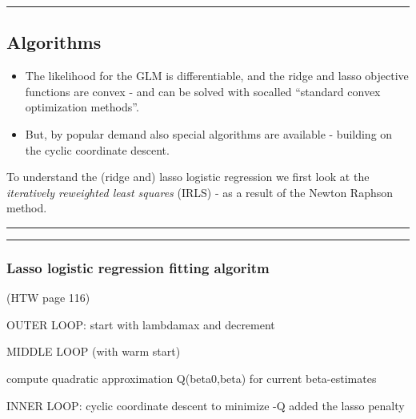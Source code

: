 \documentclass[
  letterpaper,
  DIV=11,
  numbers=noendperiod]{scrartcl}
\newenvironment{Shaded}{\begin{snugshade}}{\end{snugshade}}
\newcommand{\ControlFlowTok}[1]{\textcolor[rgb]{0.00,0.23,0.31}{#1}}
\newcommand{\FunctionTok}[1]{\textcolor[rgb]{0.28,0.35,0.67}{#1}}
\newcommand{\NormalTok}[1]{\textcolor[rgb]{0.00,0.23,0.31}{#1}}
\newcommand{\SpecialCharTok}[1]{\textcolor[rgb]{0.37,0.37,0.37}{#1}}
\providecommand{\tightlist}{%
  \setlength{\itemsep}{0pt}\setlength{\parskip}{0pt}}\usepackage{longtable,booktabs,array}
\begin{document}
\begin{center}\rule{0.5\linewidth}{0.5pt}\end{center}

\hypertarget{algorithms}{%
\subsection{Algorithms}\label{algorithms}}

\begin{itemize}
\tightlist
\item
  The likelihood for the GLM is differentiable, and the ridge and lasso
  objective functions are convex - and can be solved with socalled
  ``standard convex optimization methods''.
\item
  But, by popular demand also special algorithms are available -
  building on the cyclic coordinate descent.
\end{itemize}

To understand the (ridge and) lasso logistic regression we first look at
the \emph{iteratively reweighted least squares} (IRLS) - as a result of
the Newton Raphson method.

\begin{center}\rule{0.5\linewidth}{0.5pt}\end{center}

\begin{center}\rule{0.5\linewidth}{0.5pt}\end{center}

\hypertarget{lasso-logistic-regression-fitting-algoritm}{%
\subsubsection{Lasso logistic regression fitting
algoritm}\label{lasso-logistic-regression-fitting-algoritm}}

(HTW page 116)

\begin{Shaded}
\begin{Highlighting}[]
\NormalTok{OUTER LOOP}\SpecialCharTok{:}\NormalTok{ start with lambdamax and decrement}

\NormalTok{      MIDDLE }\FunctionTok{LOOP}\NormalTok{ (with warm start) }
         
\NormalTok{         compute quadratic approximation }\FunctionTok{Q}\NormalTok{(beta0,beta) }
         \ControlFlowTok{for}\NormalTok{ current beta}\SpecialCharTok{{-}}\NormalTok{estimates}
         
         
         
\NormalTok{              INNER LOOP}\SpecialCharTok{:}\NormalTok{ cyclic coordinate descent}
\NormalTok{              to minimize }\SpecialCharTok{{-}}\NormalTok{Q added the lasso penalty}
\end{Highlighting}
\end{Shaded}
\end{document}
